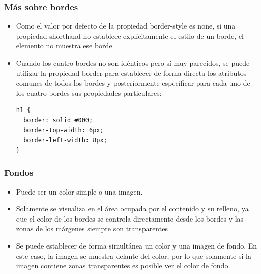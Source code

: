 
\begin{frame}[fragile]
\frametitle{Más sobre bordes}

\begin{itemize}
  \item Como el valor por defecto de la propiedad border-style es none, si una propiedad shorthand no establece explícitamente el estilo de un borde, el elemento no muestra ese borde
  \item Cuando los cuatro bordes no son idénticos pero sí muy parecidos, se puede utilizar la propiedad border para establecer de forma directa los atributos comunes de todos los bordes y posteriormente especificar para cada uno de los cuatro bordes sus propiedades particulares:
\begin{verbatim}
h1 {
  border: solid #000;
  border-top-width: 6px;
  border-left-width: 8px;
}
\end{verbatim}
\end{itemize}

\end{frame}


\begin{frame}
\frametitle{Fondos}

\begin{itemize}
  \item Puede ser un color simple o una imagen.
  \item Solamente se visualiza en el área ocupada por el contenido y su relleno, ya que el color de los bordes se controla directamente desde los bordes y las zonas de los márgenes siempre son transparentes
  \item Se puede establecer de forma simultánea un color y una imagen de fondo. En este caso, la imagen se muestra delante del color, por lo que solamente si la imagen contiene zonas transparentes es posible ver el color de fondo.
\end{itemize}

\end{frame}



